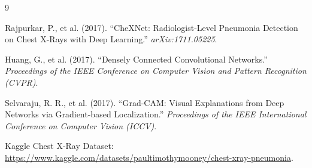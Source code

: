 \documentclass[12pt,oneside]{report}
\begin{document}
\begin{thebibliography}{9}

Rajpurkar, P., et al. (2017). 
``CheXNet: Radiologist-Level Pneumonia Detection on Chest X-Rays with Deep Learning.'' 
\textit{arXiv:1711.05225}.

Huang, G., et al. (2017). 
``Densely Connected Convolutional Networks.'' 
\textit{Proceedings of the IEEE Conference on Computer Vision and Pattern Recognition (CVPR)}.

Selvaraju, R. R., et al. (2017). 
``Grad-CAM: Visual Explanations from Deep Networks via Gradient-based Localization.'' 
\textit{Proceedings of the IEEE International Conference on Computer Vision (ICCV)}.

Kaggle Chest X-Ray Dataset: \\
\url{https://www.kaggle.com/datasets/paultimothymooney/chest-xray-pneumonia}.

\end{thebibliography}
\end{document}
